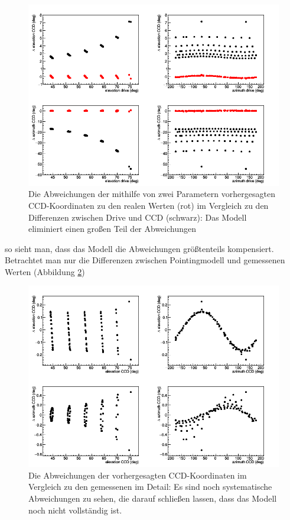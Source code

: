\begin{figure}[htbp]
\centering
\includegraphics[width=\textwidth]{../341/C2Dcomp.png}
\caption{Die Abweichungen der mithilfe von zwei Parametern vorhergesagten CCD-Koordinaten zu den realen Werten (rot) im Vergleich zu den Differenzen zwischen Drive und CCD (schwarz): Das Modell eliminiert einen großen Teil der Abweichungen}
\label{img:C2Dcomp}
\end{figure}
so sieht man, dass das Modell die Abweichungen größtenteils kompensiert. Betrachtet man nur die Differenzen zwischen Pointingmodell und gemessenen Werten (Abbildung \ref{img:C2D})
\begin{figure}[htbp]
\centering
\includegraphics[width=\textwidth]{../341/C2D.png}
\caption{Die Abweichungen der vorhergesagten CCD-Koordinaten im Vergleich zu den gemessenen im Detail: Es sind noch systematische Abweichungen zu sehen, die darauf schließen lassen, dass das Modell noch nicht vollständig ist.}
\label{img:C2D}
\end{figure}
